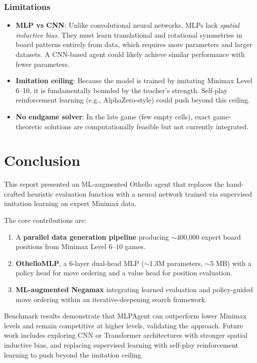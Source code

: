 \subsubsection{Limitations}

\begin{itemize}
    \item \textbf{MLP vs CNN}: Unlike convolutional neural networks, MLPs lack \textit{spatial inductive bias}. They must learn translational and rotational symmetries in board patterns entirely from data, which requires more parameters and larger datasets. A CNN-based agent could likely achieve similar performance with fewer parameters.
    \item \textbf{Imitation ceiling}: Because the model is trained by imitating Minimax Level 6--10, it is fundamentally bounded by the teacher's strength. Self-play reinforcement learning (e.g., AlphaZero-style) could push beyond this ceiling.
    \item \textbf{No endgame solver}: In the late game (few empty cells), exact game-theoretic solutions are computationally feasible but not currently integrated.
\end{itemize}

\section{Conclusion}

This report presented an ML-augmented Othello agent that replaces the hand-crafted heuristic evaluation function with a neural network trained via supervised imitation learning on expert Minimax data.

The core contributions are:
\begin{enumerate}
    \item A \textbf{parallel data generation pipeline} producing $\sim$400{,}000 expert board positions from Minimax Level 6--10 games.
    \item \textbf{OthelloMLP}, a 6-layer dual-head MLP ($\sim$1.3M parameters, $\sim$5 MB) with a policy head for move ordering and a value head for position evaluation.
    \item \textbf{ML-augmented Negamax} integrating learned evaluation and policy-guided move ordering within an iterative-deepening search framework.
\end{enumerate}

Benchmark results demonstrate that MLPAgent can outperform lower Minimax levels and remain competitive at higher levels, validating the approach. Future work includes exploring CNN or Transformer architectures with stronger spatial inductive bias, and replacing supervised learning with self-play reinforcement learning to push beyond the imitation ceiling.

